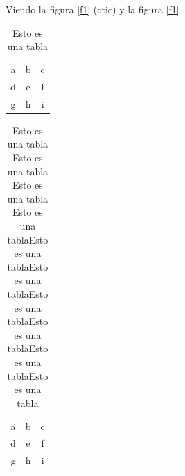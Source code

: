 \documentclass{report}
\begin{document}

Viendo la figura \ref{f1} (ctic) y la figura \ref{f1}

\begin{table}[H]
\centering
\caption{Esto es una tabla}
	\begin{tabular}{|cc|c}
		\hline
		a & b & c \\
		d & e & f \\
		g & h & i \\
		\hline
	\end{tabular}
\end{table}

\begin{table}[H]
	\centering
	\caption{Esto es una tabla Esto es una tabla Esto es una tabla Esto es una tablaEsto es una tablaEsto es una tablaEsto es una tablaEsto es una tablaEsto es una tablaEsto es una tabla}
	\begin{tabular}{|cc|c}
		\hline
		a & b & c \\
		d & e & f \\
		g & h & i \\
		\hline
	\end{tabular}
\end{table}
\end{document}
